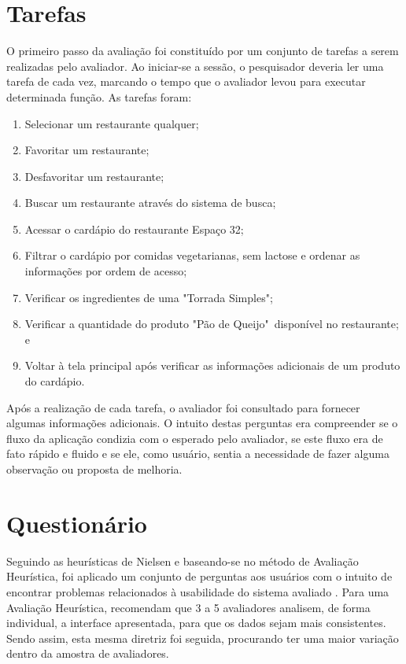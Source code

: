 \section{Tarefas}
O primeiro passo da avaliação foi constituído por um conjunto de tarefas a serem realizadas pelo avaliador. Ao iniciar-se a sessão, o pesquisador deveria ler uma tarefa de cada vez, marcando o tempo que o avaliador levou para executar determinada função. As tarefas foram:
\begin{enumerate}
	\item Selecionar um restaurante qualquer;
	\item Favoritar um restaurante;
	\item Desfavoritar um restaurante;
	\item Buscar um restaurante através do sistema de busca;
	\item Acessar o cardápio do restaurante Espaço 32;
	\item Filtrar o cardápio por comidas vegetarianas, sem lactose e ordenar as informações por ordem de acesso;
	\item Verificar os ingredientes de uma "Torrada Simples";
	\item Verificar a quantidade do produto "Pão de Queijo"\ disponível no restaurante; e
	\item Voltar à tela principal após verificar as informações adicionais de um produto do cardápio.
\end{enumerate}
Após a realização de cada tarefa, o avaliador foi consultado para fornecer algumas informações adicionais. O intuito destas perguntas era compreender se o fluxo da aplicação condizia com o esperado pelo avaliador, se este fluxo era de fato rápido e fluido e se ele, como usuário, sentia a necessidade de fazer alguma observação ou proposta de melhoria.

\section{Questionário}

Seguindo as heurísticas de Nielsen \cite{NIELSEN1995} e baseando-se no método de Avaliação Heurística, foi aplicado um conjunto de perguntas aos usuários com o intuito de encontrar problemas relacionados à usabilidade do sistema avaliado \cite{PRATES2003}. Para uma Avaliação Heurística, \cite{WINCKLER2002} recomendam que 3 a 5 avaliadores analisem, de forma individual, a interface apresentada, para que os dados sejam mais consistentes. Sendo assim, esta mesma diretriz foi seguida, procurando ter uma maior variação dentro da amostra de avaliadores.

